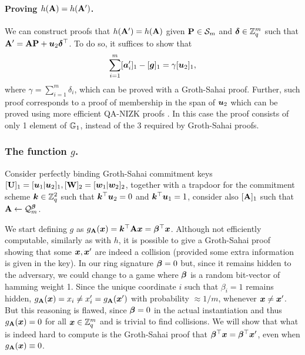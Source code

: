 \paragraph{Proving $h(\mathbf{{A}})=h(\mathbf{{A}}')$.} We can construct proofs that $h(\mathbf{{A}}') = h(\mathbf{{A}})$ given $\mathbf{{P}}\in\mathcal{S}_m$ and ${\boldsymbol{\delta}}\in\mathbb{Z}_q^m$ such that $\mathbf{{A}}' = \mathbf{{A}}\mathbf{{P}}+{\boldsymbol{u}}_2{\boldsymbol{\delta}}^\top$. To do so, it suffices to show that
\begin{equation}
\sum_{i=1}^{m}[{\boldsymbol{a}}'_i]_1 - [{\boldsymbol{g}}]_1 = \gamma[{\boldsymbol{u}}_2]_1,
\label{eq:coll-h}
\end{equation}
where $\gamma = \sum_{i=1}^m \delta_i$,
which can be proved with a Groth-Sahai proof. Further, such proof corresponds to a proof of membership in the span of ${\boldsymbol{u}}_2$ which can be proved using more efficient QA-NIZK proofs \cite{C:JutRoy14,EC:KilWee15}. In this case the proof consists of only 1 element of $\mathbb{G}_1$, instead of the $3$ required by Groth-Sahai proofs.

\subsubsection{The function $g$.} Consider perfectly binding Groth-Sahai commitment keys $[\mathbf{{U}}]_1=[{\boldsymbol{u}}_1|{\boldsymbol{u}}_2]_1,[\mathbf{{W}}]_2 = [{\boldsymbol{w}}_1|{\boldsymbol{w}}_2]_2$, together with a trapdoor for the commitment scheme ${\boldsymbol{k}}\in\mathbb{Z}_q^2$ such that ${\boldsymbol{k}}^\top{\boldsymbol{u}}_2=0$ and ${\boldsymbol{k}}^\top{\boldsymbol{u}}_1=1$, consider also $[\mathbf{{A}}]_1$ such that $\mathbf{{A}}\gets\mathcal{Q}_m^{\boldsymbol{\beta}}$.

We start defining $g$ as $g_{\mathbf{{A}}}({\boldsymbol{x}}) = {\boldsymbol{k}}^\top\mathbf{{A}}{\boldsymbol{x}} = {\boldsymbol{\beta}}^\top{\boldsymbol{x}}$. Although not efficiently computable, similarly as with $h$, it is possible to give a Groth-Sahai proof showing that some ${\boldsymbol{x}},{\boldsymbol{x}}'$ are indeed a collision (provided some extra information is given in the key).
In our ring signature ${\boldsymbol{\beta}}=0$ but, since it remains hidden to the adversary, we could change to a game where ${\boldsymbol{\beta}}$ is a random bit-vector of hamming weight 1. Since the unique coordinate $i$ such that $\beta_i=1$ remains hidden, $g_{\mathbf{{A}}}({\boldsymbol{x}}) = x_i \neq x'_i =g_{\mathbf{{A}}}({\boldsymbol{x}}')$ with probability $\approx 1/m$, whenever ${\boldsymbol{x}}\neq{\boldsymbol{x}}'$. But this reasoning is flawed, since ${\boldsymbol{\beta}}=0$ in the actual instantiation and thus $g_{\mathbf{{A}}}({\boldsymbol{x}}) = 0$ for all ${\boldsymbol{x}}\in\mathbb{Z}_q^m$ and is trivial to find collisions.
We will show that what is indeed hard to compute is the Groth-Sahai proof that ${\boldsymbol{\beta}}^\top{\boldsymbol{x}} = {\boldsymbol{\beta}}^\top{\boldsymbol{x}}'$, even when $g_{\mathbf{{A}}}({\boldsymbol{x}})\equiv 0$.

